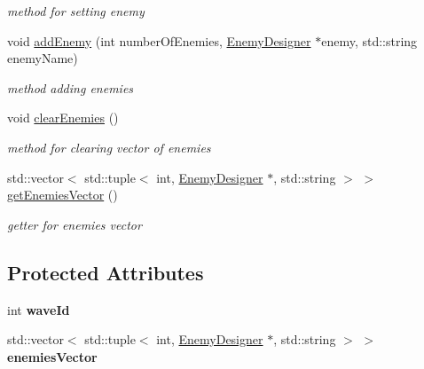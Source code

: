 \begin{DoxyCompactItemize}
\begin{DoxyCompactList}\small\item\em method for setting enemy \end{DoxyCompactList}\item 
void \mbox{\hyperlink{class_wave_a751c1e868a8b9c3d3f41063cdd474eb4}{add\+Enemy}} (int number\+Of\+Enemies, \mbox{\hyperlink{class_enemy_designer}{Enemy\+Designer}} $\ast$enemy, std\+::string enemy\+Name)
\begin{DoxyCompactList}\small\item\em method adding enemies \end{DoxyCompactList}\item 
\mbox{\label{class_wave_a6c8aea6a9da3db3b0546ff7316b9df6b}} 
void \mbox{\hyperlink{class_wave_a6c8aea6a9da3db3b0546ff7316b9df6b}{clear\+Enemies}} ()
\begin{DoxyCompactList}\small\item\em method for clearing vector of enemies \end{DoxyCompactList}\item 
\mbox{\label{class_wave_a2d064fab7f420a917739346ffb8aa30d}} 
std\+::vector$<$ std\+::tuple$<$ int, \mbox{\hyperlink{class_enemy_designer}{Enemy\+Designer}} $\ast$, std\+::string $>$ $>$ \mbox{\hyperlink{class_wave_a2d064fab7f420a917739346ffb8aa30d}{get\+Enemies\+Vector}} ()
\begin{DoxyCompactList}\small\item\em getter for enemies vector \end{DoxyCompactList}\end{DoxyCompactItemize}
\subsection*{Protected Attributes}
\begin{DoxyCompactItemize}
\item 
\mbox{\label{class_wave_aa18fc1c8a7981abb4e004825ece2bf84}} 
int {\bfseries wave\+Id}
\item 
\mbox{\label{class_wave_a815713abfba3a012c83da2396826fff7}} 
std\+::vector$<$ std\+::tuple$<$ int, \mbox{\hyperlink{class_enemy_designer}{Enemy\+Designer}} $\ast$, std\+::string $>$ $>$ {\bfseries enemies\+Vector}
\end{DoxyCompactItemize}


